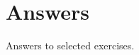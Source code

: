 \chapter{Answers}
Answers to selected exercises.\\
\begin{multicols}{2}\raggedcolumns
	\shipoutAnswer
\end{multicols}
